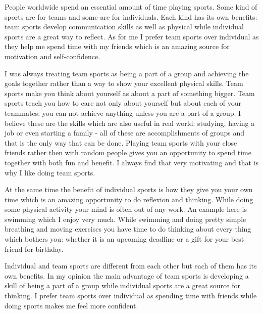 \documentclass{article}
\begin{document}
People worldwide spend an essential amount of time playing sports. Some kind of
sports are for teams and some are for individuals. Each kind has its own
benefits: team sports develop communication skills as well as
physical while individual sports are a great way to reflect. As for me I prefer
team sports over individual as they help me spend time with my friends which
is an amazing source for motivation and self-confidence.

I was always treating team sports as being a part of a group and achieving the
goals together rather than a way to show your excellent physical skills.
Team sports make you think about yourself as about a part of something bigger.
Team sports teach you how to care not only about yourself but about each of
your teammates: you can not achieve anything unless you are a part of a group.
I believe these are the skills which are also useful in real world: studying,
having a job or even starting a family - all of these are accomplishments of
groups and that is the only way that can be done. Playing team
sports with your close friends rather then with random people gives you an
opportunity to spend time together with both fun and benefit.
I always find that very motivating and that is why I like doing team sports.

At the same time the benefit of individual sports is how they give you your
own time which is an amazing opportunity to do reflexion and thinking.
While doing some physical activity your mind is often out of any work. An example
here is swimming which I enjoy very much. While swimming and doing pretty simple
breathing and moving exercises you have time to do thinking about every thing
which bothers you: whether it is an upcoming deadline or a gift for your best
friend for birthday.

Individual and team sports are different from each other but each of them
has its own benefits. In my opinion the main advantage of team sports is
developing a skill of being a part of a group while individual sports are a
great source for thinking. I prefer team sports over individual as spending time
with friends while doing sports makes me feel more confident.
\end{document}
